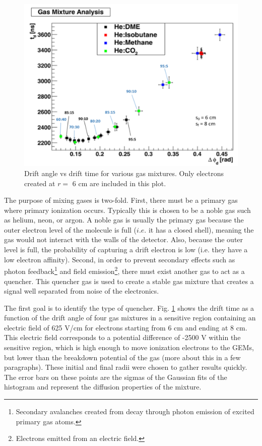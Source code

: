 \begin{figure}[h!]
	\centering
	\includegraphics[width=0.8\linewidth]{figures/gas_opt_phi_vs_t.png}
	\caption{Drift angle vs drift time for various gas mixtures. Only electrons created at $r=$ 6 cm are included in this plot.}
	\label{fig:gas_opt_phi_vs_t}
\end{figure}

The purpose of mixing gases is two-fold. First, there must be a primary gas where primary ionization occurs. Typically this is chosen to be a noble gas such as helium, neon, or argon. A noble gas is usually the primary gas because the outer electron level of the molecule is full ($i.e.$ it has a closed shell), meaning the gas would not interact with the walls of the detector. Also, because the outer level is full, the probability of capturing a drift electron is low (i.e. they have a low electron affinity). Second, in order to prevent secondary effects such as photon feedback\footnote{Secondary avalanches created from decay through photon emission of excited primary gas atoms.} and field emission\footnote{Electrons emitted from an electric field.}, there must exist another gas to act as a quencher. This quencher gas is used to create a stable gas mixture that creates a signal well separated from noise of the electronics.

The first goal is to identify the type of quencher. Fig. \ref{fig:gas_opt_phi_vs_t} shows the drift time as a function of the drift angle of four gas mixtures in a sensitive region containing an electric field of 625 V/cm for electrons starting from 6 cm and ending at 8 cm. This electric field corresponds to a potential difference of -2500 V within the sensitive region, which is high enough to move ionization electrons to the GEMs, but lower than the breakdown potential of the gas (more about this in a few paragraphs). These initial and final radii were chosen to gather results quickly. The error bars on these points are the sigmas of the Gaussian fits of the histogram and represent the diffusion properties of the mixture.

